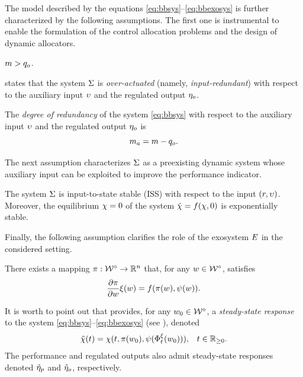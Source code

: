 The model described by the equations \eqref{eq:bbsys}--\eqref{eq:bbexosys} is further characterized by the following assumptions. The first one is instrumental to enable the formulation of the control allocation problems and the design of dynamic allocators.
\begin{assumption}
  \label{ass:bboveract}
  $m>{q_o}$.\closestatement
\end{assumption}
 states that the system $\Sigma$ is \emph{over-actuated} (namely, \emph{input-redundant}) with respect to the auxiliary input $\upsilon$ and the regulated output $\eta_o$.
\begin{definition}
  \label{def:bbreddeg}
  The \emph{degree of redundancy} of the system \eqref{eq:bbsys} with respect to the auxiliary input $\upsilon$ and the regulated output $\eta_o$ is
  \begin{equation}
    \label{eq:bbreddeg}
    m_a = m - {q_o}.
  \end{equation}
  \closestatement
\end{definition}
The next assumption characterizes $\Sigma$ as a preexisting dynamic system whose auxiliary input can be exploited to improve the performance indicator.
\begin{assumption}
  \label{ass:bbiss}
  The system $\Sigma$ is input-to-state stable (ISS) with respect to the input $(r,\upsilon)$. Moreover, the equilibrium $\chi=0$ of the system $\dot{\chi} = f(\chi,0)$ is exponentially stable.\closestatement
\end{assumption}
Finally, the following assumption clarifies the role of the exosystem $E$ in the considered setting.
\begin{assumption}
  \label{ass:bbssresp}
  There exists a mapping $\pi : \mathcal{W}^\circ \rightarrow \mathbb{R}^n$ that, for any $w\in\mathcal{W}^{\circ}$, satisfies
  \begin{equation}
    \label{eq:bbfbi}
    \frac{\partial\pi}{\partial w}\xi(w) = f(\pi(w), \psi(w)).
  \end{equation}
  \closestatement
\end{assumption}
It is worth to point out that  provides, for any $w_0\in\mathcal{W}^\circ$, a \emph{steady-state response} to the system \eqref{eq:bbsys}--\eqref{eq:bbexosys} (see \cite[Prop. 8.1.1]{isidori_nonlinear_1995}), denoted
\begin{align}
  \label{eq:bbssresp}
  \tilde{\chi}(t) &= \chi(t,\pi(w_0),\psi(\Phi_t^\xi(w_0))), & t\in\mathbb{R}_{\geq 0}.
\end{align}
The performance and regulated outputs also admit steady-state responses denoted $\tilde{\eta}_p$ and $\tilde{\eta}_o$, respectively.

